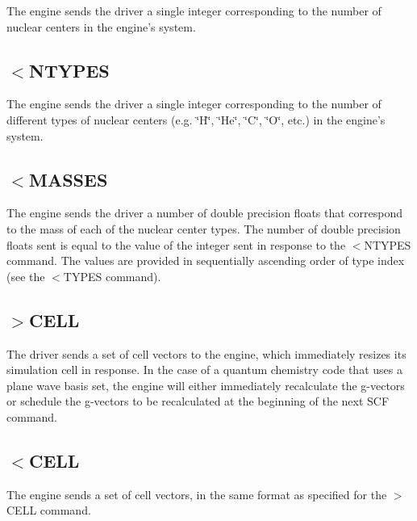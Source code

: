 The engine sends the driver a single integer corresponding to the number of nuclear centers in the engine's system.\hypertarget{index_recv_types}{}\subsection{$<$\-N\-T\-Y\-P\-E\-S}\label{index_recv_types}
The engine sends the driver a single integer corresponding to the number of different types of nuclear centers (e.\-g. \char`\"{}\-H\char`\"{}, \char`\"{}\-He\char`\"{}, \char`\"{}\-C\char`\"{}, \char`\"{}\-O\char`\"{}, etc.) in the engine's system.\hypertarget{index_recv_masses}{}\subsection{$<$\-M\-A\-S\-S\-E\-S}\label{index_recv_masses}
The engine sends the driver a number of double precision floats that correspond to the mass of each of the nuclear center types. The number of double precision floats sent is equal to the value of the integer sent in response to the $<$N\-T\-Y\-P\-E\-S command. The values are provided in sequentially ascending order of type index (see the {\ttfamily $<$T\-Y\-P\-E\-S} command).\hypertarget{index_set_cell}{}\subsection{$>$\-C\-E\-L\-L}\label{index_set_cell}
The driver sends a set of cell vectors to the engine, which immediately resizes its simulation cell in response. In the case of a quantum chemistry code that uses a plane wave basis set, the engine will either immediately recalculate the g-\/vectors or schedule the g-\/vectors to be recalculated at the beginning of the next S\-C\-F command.\hypertarget{index_recv_cell}{}\subsection{$<$\-C\-E\-L\-L}\label{index_recv_cell}
The engine sends a set of cell vectors, in the same format as specified for the {\ttfamily $>$C\-E\-L\-L} command. 